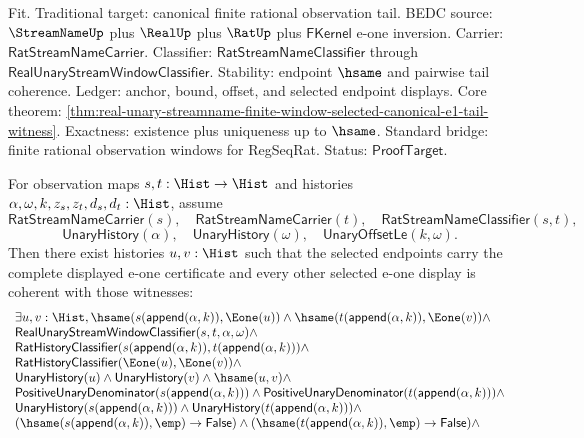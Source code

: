 Fit. Traditional target: canonical finite rational observation tail. BEDC
source: $\StreamNameUp$ plus $\RealUp$ plus $\RatUp$ plus $\mathsf{FKernel}$
e-one inversion. Carrier: $\mathsf{RatStreamNameCarrier}$. Classifier:
$\mathsf{RatStreamNameClassifier}$ through
$\mathsf{RealUnaryStreamWindowClassifier}$. Stability: endpoint $\hsame$ and
pairwise tail coherence. Ledger: anchor, bound, offset, and selected endpoint
displays. Core
theorem:
\autoref{thm:real-unary-streamname-finite-window-selected-canonical-e1-tail-witness}.
Exactness: existence plus uniqueness up to $\hsame$. Standard bridge: finite
rational observation windows for RegSeqRat. Status: $\mathsf{ProofTarget}$.

\begin{theorem}
\label{thm:real-unary-streamname-finite-window-selected-canonical-e1-tail-full-package}
For observation maps $s,t:\Hist\to\Hist$ and histories
$\alpha,\omega,k,z_s,z_t,d_s,d_t:\Hist$, assume
$$
\mathsf{RatStreamNameCarrier}(s),\quad
\mathsf{RatStreamNameCarrier}(t),\quad
\mathsf{RatStreamNameClassifier}(s,t),
$$
$$
\mathsf{UnaryHistory}(\alpha),\quad
\mathsf{UnaryHistory}(\omega),\quad
\mathsf{UnaryOffsetLe}(k,\omega).
$$
Then there exist histories $u,v:\Hist$ such that the selected endpoints carry
the complete displayed e-one certificate and every other selected e-one display
is coherent with those witnesses:
$$
\begin{array}{l}
\exists u,v:\Hist,
\hsame(s(\mathsf{append}(\alpha,k)),\Eone(u))\land
\hsame(t(\mathsf{append}(\alpha,k)),\Eone(v))\land\\
\mathsf{RealUnaryStreamWindowClassifier}(s,t,\alpha,\omega)\land\\
\mathsf{RatHistoryClassifier}(s(\mathsf{append}(\alpha,k)),t(\mathsf{append}(\alpha,k)))\land\\
\mathsf{RatHistoryClassifier}(\Eone(u),\Eone(v))\land\\
\mathsf{UnaryHistory}(u)\land\mathsf{UnaryHistory}(v)\land\hsame(u,v)\land\\
\mathsf{PositiveUnaryDenominator}(s(\mathsf{append}(\alpha,k)))\land
\mathsf{PositiveUnaryDenominator}(t(\mathsf{append}(\alpha,k)))\land\\
\mathsf{UnaryHistory}(s(\mathsf{append}(\alpha,k)))\land
\mathsf{UnaryHistory}(t(\mathsf{append}(\alpha,k)))\land\\
(\hsame(s(\mathsf{append}(\alpha,k)),\emp)\to\mathsf{False})\land
(\hsame(t(\mathsf{append}(\alpha,k)),\emp)\to\mathsf{False})\land\\

\end{array}$$
\end{theorem}
